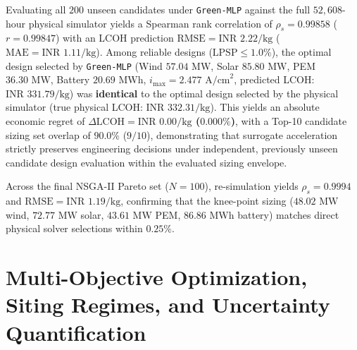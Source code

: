 \documentclass[conference]{IEEEtran}
\begin{document}
\begin{enumerate}
    Evaluating all $200$ unseen candidates under \texttt{Green-MLP} against the full $52,608$-hour physical simulator yields a Spearman rank correlation of $\rho_s = \mathbf{0.99858}$ ($r = 0.99847$) with an LCOH prediction $\text{RMSE} = \text{INR } 2.22/\text{kg}$ ($\text{MAE} = \text{INR } 1.11/\text{kg}$). Among reliable designs ($\text{LPSP} \le 1.0\%$), the optimal design selected by \texttt{Green-MLP} (Wind $57.04\text{ MW}$, Solar $85.80\text{ MW}$, PEM $36.30\text{ MW}$, Battery $20.69\text{ MWh}$, $i_{\max} = 2.477\text{ A/cm}^2$, predicted LCOH: $\text{INR } 331.79/\text{kg}$) was \textbf{identical} to the optimal design selected by the physical simulator (true physical LCOH: $\text{INR } 332.31/\text{kg}$). This yields an absolute economic regret of \textbf{$\Delta \text{LCOH} = \text{INR } 0.00/\text{kg}$ ($0.000\%$)}, with a Top-10 candidate sizing set overlap of $\mathbf{90.0\%}$ ($9/10$), demonstrating that surrogate acceleration strictly preserves engineering decisions under independent, previously unseen candidate design evaluation within the evaluated sizing envelope.
    
    Across the final NSGA-II Pareto set ($N=100$), re-simulation yields $\rho_s = 0.9994$ and $\text{RMSE} = \text{INR } 1.19/\text{kg}$, confirming that the knee-point sizing ($48.02\text{ MW}$ wind, $72.77\text{ MW}$ solar, $43.61\text{ MW}$ PEM, $86.86\text{ MWh}$ battery) matches direct physical solver selections within $0.25\%$.
\end{enumerate}

\section{Multi-Objective Optimization, Siting Regimes, and Uncertainty Quantification}
\end{document}
